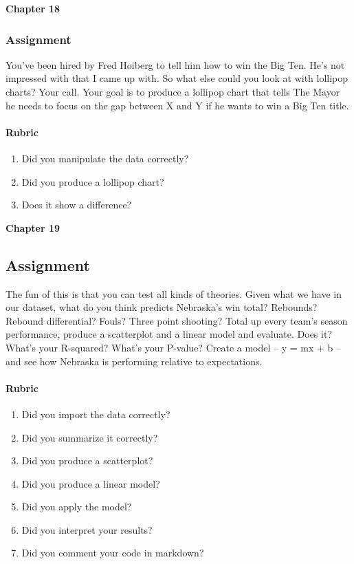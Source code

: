 \documentclass[]{book}
\providecommand{\tightlist}{%
  \setlength{\itemsep}{0pt}\setlength{\parskip}{0pt}}
\let\oldparagraph\paragraph
\renewcommand{\paragraph}[1]{\oldparagraph{#1}\mbox{}}
\begin{document}
\textbf{Chapter 18}

\subsubsection{Assignment}\label{assignment-11}

You've been hired by Fred Hoiberg to tell him how to win the Big Ten.
He's not impressed with that I came up with. So what else could you look
at with lollipop charts? Your call. Your goal is to produce a lollipop
chart that tells The Mayor he needs to focus on the gap between X and Y
if he wants to win a Big Ten title.

\paragraph{Rubric}\label{rubric-8}

\begin{enumerate}
\def\labelenumi{\arabic{enumi}.}
\tightlist
\item
  Did you manipulate the data correctly?
\item
  Did you produce a lollipop chart?
\item
  Does it show a difference?
\end{enumerate}

\textbf{Chapter 19}

\subsection{Assignment}\label{assignment-12}

The fun of this is that you can test all kinds of theories. Given what
we have in our dataset, what do you think predicts Nebraska's win total?
Rebounds? Rebound differential? Fouls? Three point shooting? Total up
every team's season performance, produce a scatterplot and a linear
model and evaluate. Does it? What's your R-squared? What's your P-value?
Create a model -- y = mx + b -- and see how Nebraska is performing
relative to expectations.

\paragraph{Rubric}\label{rubric-9}

\begin{enumerate}
\def\labelenumi{\arabic{enumi}.}
\tightlist
\item
  Did you import the data correctly?
\item
  Did you summarize it correctly?
\item
  Did you produce a scatterplot?
\item
  Did you produce a linear model?
\item
  Did you apply the model?
\item
  Did you interpret your results?
\item
  Did you comment your code in markdown?
\end{enumerate}
\end{document}
